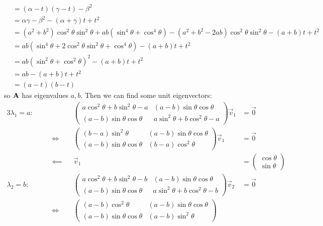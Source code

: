 \documentclass[fleqn,a4paper,11pt]{article}
\begin{document}
\begin{enumerate}[label=\textbf{\arabic*.}]
\begin{align*}
    &= (\alpha - t)(\gamma - t) - \beta^2 \\
    &= \alpha \gamma - \beta^2 - (\alpha + \gamma)t + t^2 \\
    &= (a^2 + b^2)\cos^2 \theta \sin^2 \theta
     + ab(\sin^4 \theta + \cos^4 \theta)
     - (a^2 + b^2 - 2ab)\cos^2 \theta \sin^2 \theta
     - (a + b)t + t^2 \\
    &= ab(\sin^4 \theta + 2\cos^2 \theta \sin^2 \theta + \cos^4 \theta)
     - (a + b)t + t^2 \\
    &= ab(\sin^2 \theta + \cos^2 \theta)^2
     - (a + b)t + t^2 \\
    &= ab - (a + b)t + t^2 \\
    &= (a - t)(b - t)
   \end{align*}
   so \(\mathbf{A}\) has eigenvalues \(a, b\). Then we can find some unit
   eigenvectors:
   \begin{alignat*}3
    \lambda_1 = a:\quad&& &&
    \begin{pmatrix}
     a \cos^2 \theta + b \sin^2 \theta - a & (a - b)\sin \theta \cos \theta \\
     (a - b) \sin \theta \cos \theta & a \sin^2 \theta + b \cos^2 \theta - a
    \end{pmatrix}
    \vec v_1 &= \vec 0 \\
    &&\iff{}&&
    \begin{pmatrix}
     (b - a)\sin^2 \theta & (a - b)\sin \theta \cos \theta \\
     (a - b) \sin \theta \cos \theta & (b - a)\cos^2 \theta
    \end{pmatrix}
    \vec v_1 &= \vec 0 \\
    &&\impliedby{}&&
    \vec v_1 &= \begin{pmatrix} \cos \theta \\ \sin \theta \end{pmatrix} \\
    \lambda_2 = b:\quad&& &&
    \begin{pmatrix}
     a \cos^2 \theta + b \sin^2 \theta - b & (a - b)\sin \theta \cos \theta \\
     (a - b) \sin \theta \cos \theta & a \sin^2 \theta + b \cos^2 \theta - b
    \end{pmatrix}
    \vec v_2 &= \vec 0 \\
    &&\iff{}&&
    \begin{pmatrix}
     (a - b) \cos^2 \theta & (a - b)\sin \theta \cos \theta \\
     (a - b) \sin \theta \cos \theta & (a - b) \sin^2 \theta

\end{pmatrix}
\end{alignat*}
\end{enumerate}
\end{document}
